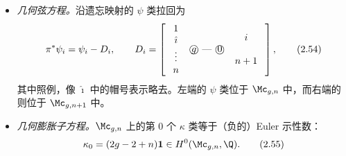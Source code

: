 \begin{itemize}
  \item \emph{几何弦方程。}沿遗忘映射的 $\psi$ 类拉回为
  \begin{equation}
    \pi^*\psi_i=\psi_i-D_i,\qquad
    D_i=\left[\;
    \begin{array}{c}1\\ \hat{\imath}\\ \vdots\\ n\end{array}
    \;\;\mbox{\textcircled{$g$}}\ \mbox{---}\ \mbox{\textcircled{$0$}}\;\;
    \begin{array}{c}i\\ \\ n+1\end{array}
    \;\right],
    \tag{2.54}
  \end{equation}
  其中照例，像 $\hat{\imath}$ 中的帽号表示略去。左端的 $\psi$ 类位于 $\Mc_{g,n}$ 中，而右端的则位于 $\Mc_{g,n+1}$ 中。
  \item \emph{几何膨胀子方程。}$\Mc_{g,n}$ 上的第 $0$ 个 $\kappa$ 类等于（负的）Euler 示性数：
  \begin{equation}
    \kappa_0=(2g-2+n)\mathbf{1}\in H^0(\Mc_{g,n},\Q).
    \tag{2.55}
  \end{equation}
\end{itemize}

